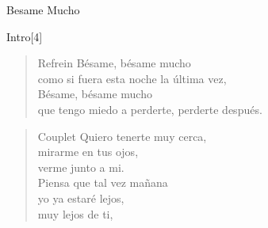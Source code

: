 \begin{song}[bolero]{Besame Mucho}
\begin{instrumental}{Intro}[4]
\end{instrumental}

\begin{verse}{Refrein}
Bésame, bésame mucho\\
como si fuera esta noche la última vez,\\	
Bésame, bésame mucho\\
que tengo miedo a perderte, perderte después.
\end{verse}
\begin{verse}{Couplet}
Quiero tenerte muy cerca,\\
mirarme en tus ojos, \\
verme junto a mi.\\
Piensa que tal vez mañana \\
yo ya estaré lejos,\\
muy lejos de ti,
\end{verse}

\end{song}
